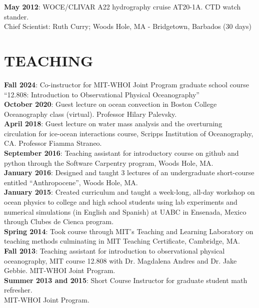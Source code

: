 \documentclass[paper=letter,fontsize=11pt]{scrartcl} %
\newcommand{\NewPart}[2]{\section*{\uppercase{#1} #2}}
\newcommand{\ShortEntry}[2]{\normalsize \noindent \textbf{#1}: #2 \\ }
\begin{document}
\ShortEntry{May 2012}{WOCE/CLIVAR A22 hydrography cruise AT20-1A. CTD watch stander.\\ Chief Scientist: Ruth Curry; Woods Hole, MA - Bridgetown, Barbados (30 days)}




\NewPart{Teaching}{}

\ShortEntry{Fall 2024}{Co-instructor for MIT-WHOI Joint Program graduate school course ``12.808: Introduction to Observational Physical Oceanography''}

\ShortEntry{October 2020}{Guest lecture on ocean convection in Boston College Oceanography class (virtual). Professor Hilary Palevsky.}

\ShortEntry{April 2018}{Guest lecture on water mass analysis and the overturning circulation for ice-ocean interactions course, Scripps Institution of Oceanography, CA. Professor Fiamma Straneo.}

\ShortEntry{September 2016}{Teaching assistant for introductory course on github and python through the Software Carpentry program, Woods Hole, MA.}

\ShortEntry{January 2016}{Designed and taught 3 lectures of an undergraduate short-course entitled ``Anthropocene'', Woods Hole, MA.}

\ShortEntry{January 2015}{Created curriculum and taught a week-long, all-day workshop on ocean physics to college and high school students using lab experiments and numerical simulations (in English and Spanish) at UABC in Ensenada, Mexico through Clubes de Cienca program.}

\ShortEntry{Spring 2014}{Took course through MIT's Teaching and Learning Laboratory on teaching methods culminating in MIT Teaching Certificate, Cambridge, MA.}

\ShortEntry{Fall 2013}{Teaching assistant for introduction to observational physical oceanography, MIT course 12.808 with Dr. Magdalena Andres and Dr. Jake Gebbie. MIT-WHOI Joint Program.}

\ShortEntry{Summer 2013 and 2015}{Short Course Instructor for graduate student math refresher.\\ MIT-WHOI Joint Program.}
\end{document}
